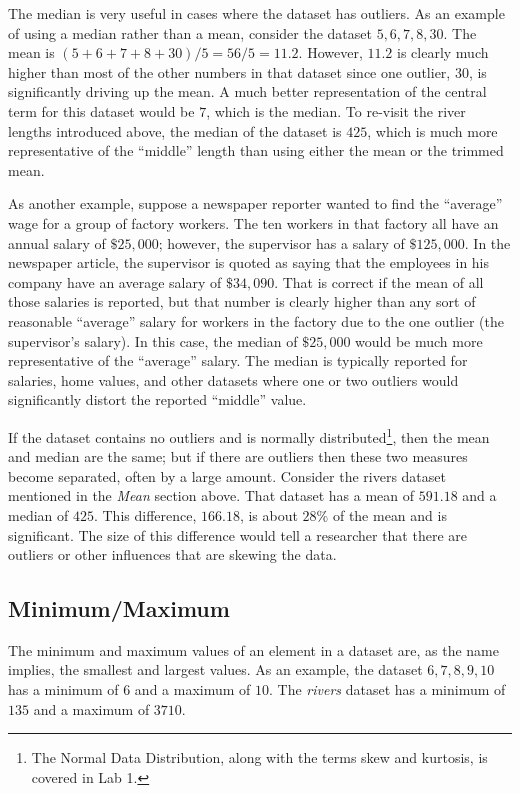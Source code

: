 The median is very useful in cases where the dataset has outliers. As an example of using a median rather than a mean, consider the dataset $ 5, 6, 7, 8, 30 $. The mean is $ (5+6+7+8+30)/5 = 56/5 = 11.2 $. However, $ 11.2 $ is clearly much higher than most of the other numbers in that dataset since one outlier, $ 30 $, is significantly driving up the mean. A much better representation of the central term for this dataset would be $ 7 $, which is the median. To re-visit the river lengths introduced above, the median of the dataset is $ 425 $, which is much more representative of the ``middle'' length than using either the mean or the trimmed mean.

As another example, suppose a newspaper reporter wanted to find the ``average'' wage for a group of factory workers. The ten workers in that factory all have an annual salary of $ \$25,000 $; however, the supervisor has a salary of $ \$125,000 $. In the newspaper article, the supervisor is quoted as saying that the employees in his company have an average salary of $ \$34,090 $. That is correct if the mean of all those salaries is reported, but that number is clearly higher than any sort of reasonable ``average'' salary for workers in the factory due to the one outlier (the supervisor's salary). In this case, the median of $ \$25,000 $ would be much more representative of the ``average'' salary. The median is typically reported for salaries, home values, and other datasets where one or two outliers would significantly distort the reported ``middle'' value.

If the dataset contains no outliers and is normally distributed\footnote{The Normal Data Distribution, along with the terms skew and kurtosis, is covered in Lab 1.}, then the mean and median are the same; but if there are outliers then these two measures become separated, often by a large amount. Consider the rivers dataset mentioned in the \textit{Mean} section above. That dataset has a mean of $ 591.18 $ and a median of $ 425 $. This difference, $ 166.18 $, is about $ 28\% $ of the mean and is significant. The size of this difference would tell a researcher that there are outliers or other influences that are skewing the data.

\subsection{Minimum/Maximum}\label{lab03_min_max}

The minimum and maximum values of an element in a dataset are, as the name implies, the smallest and largest values. As an example, the dataset $ 6, 7, 8, 9, 10 $ has a minimum of $ 6 $ and a maximum of $ 10 $. The \textit{rivers} dataset has a minimum of  $ 135 $ and a maximum of $ 3710 $. 

